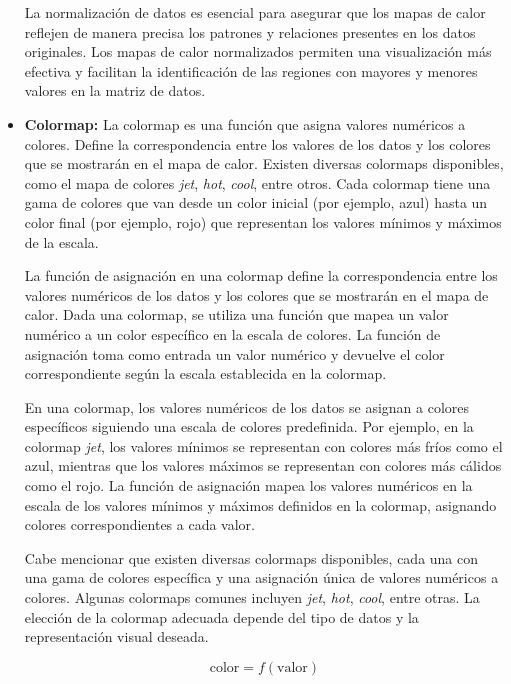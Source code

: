 \documentclass{article}
\begin{document}
\begin{itemize}
\begin{itemize}
\end{itemize}

La normalización de datos es esencial para asegurar que los mapas de calor reflejen de manera precisa los patrones y relaciones presentes en los datos originales. Los mapas de calor normalizados permiten una visualización más efectiva y facilitan la identificación de las regiones con mayores y menores valores en la matriz de datos.



\item\textbf{Colormap: } La colormap es una función que asigna valores numéricos a colores. Define la correspondencia entre los valores de los datos y los colores que se mostrarán en el mapa de calor. Existen diversas colormaps disponibles, como el mapa de colores \textit{jet}, \textit{hot}, \textit{cool}, entre otros. Cada colormap tiene una gama de colores que van desde un color inicial (por ejemplo, azul) hasta un color final (por ejemplo, rojo) que representan los valores mínimos y máximos de la escala.


La función de asignación en una colormap define la correspondencia entre los valores numéricos de los datos y los colores que se mostrarán en el mapa de calor.  Dada una colormap, se utiliza una función que mapea un valor numérico a un color específico en la escala de colores. La función de asignación toma como entrada un valor numérico y devuelve el color correspondiente según la escala establecida en la colormap. 

En una colormap, los valores numéricos de los datos se asignan a colores específicos siguiendo una escala de colores predefinida. Por ejemplo, en la colormap \textit{jet}, los valores mínimos se representan con colores más fríos como el azul, mientras que los valores máximos se representan con colores más cálidos como el rojo. La función de asignación mapea los valores numéricos en la escala de los valores mínimos y máximos definidos en la colormap, asignando colores correspondientes a cada valor.

Cabe mencionar que existen diversas colormaps disponibles, cada una con una gama de colores específica y una asignación única de valores numéricos a colores. Algunas colormaps comunes incluyen \textit{jet}, \textit{hot}, \textit{cool}, entre otras. La elección de la colormap adecuada depende del tipo de datos y la representación visual deseada.

\begin{equation}
\textrm{{color}} = f(\textrm{{valor}})
\end{equation}


\end{itemize}
\end{document}
